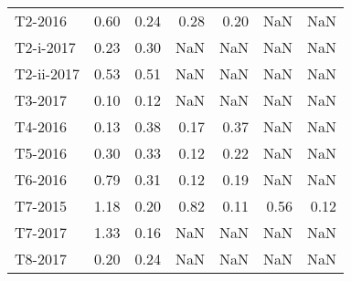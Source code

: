 \begin{tabular}{lrrrrrr}
     T2-2016 &                   0.60 &                0.24 &                   0.28 &                0.20 &                    NaN &                 NaN \\
   T2-i-2017 &                   0.23 &                0.30 &                    NaN &                 NaN &                    NaN &                 NaN \\
  T2-ii-2017 &                   0.53 &                0.51 &                    NaN &                 NaN &                    NaN &                 NaN \\
     T3-2017 &                   0.10 &                0.12 &                    NaN &                 NaN &                    NaN &                 NaN \\
     T4-2016 &                   0.13 &                0.38 &                   0.17 &                0.37 &                    NaN &                 NaN \\
     T5-2016 &                   0.30 &                0.33 &                   0.12 &                0.22 &                    NaN &                 NaN \\
     T6-2016 &                   0.79 &                0.31 &                   0.12 &                0.19 &                    NaN &                 NaN \\
     T7-2015 &                   1.18 &                0.20 &                   0.82 &                0.11 &                   0.56 &                0.12 \\
     T7-2017 &                   1.33 &                0.16 &                    NaN &                 NaN &                    NaN &                 NaN \\
     T8-2017 &                   0.20 &                0.24 &                    NaN &                 NaN &                    NaN &                 NaN \\
\bottomrule
\end{tabular}
